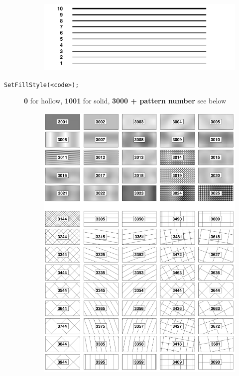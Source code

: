 \documentclass[10pt, twoside]{article}
\newcommand{\ttt}[1]{\colorbox{boxgray}{\texttt{#1}}}
\begin{document}
\begin{description}
\begin{figure}[H]
\includegraphics[scale=0.2]{imgs_root/linewidth.png}
\end{figure}
\item[\ttt{SetFillStyle(<code>);}] \textbf{0} for hollow, \textbf{1001} for solid, \textbf{3000 + pattern number} see below
\begin{figure}[h!]
\centering
\includegraphics[scale=0.18]{imgs_root/fillstyles.png}
\end{figure}
\end{description}
\end{document}
